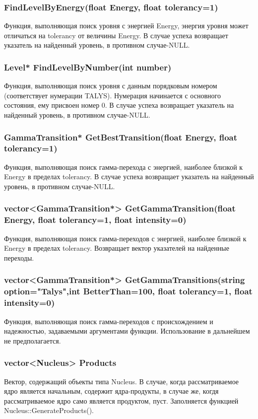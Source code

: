 \documentclass[a4paper,12pt]{extarticle}
\begin{document}
\subsubsection{FindLevelByEnergy(float Energy, float tolerancy=1)}
Функция, выполняющая поиск уровня с энергией Energy, энергия уровня может отличаться на tolerancy от величины Energy. В случае успеха возвращает указатель на найденный уровень, в противном случае-NULL.
\subsubsection{Level* FindLevelByNumber(int number)}
Функция, выполняющая поиск уровня с данным порядковым номером (соответствует нумерации TALYS). Нумерация начинается с основного состояния, ему присвоен номер 0. В случае успеха возвращает указатель на найденный уровень, в противном случае-NULL.
\subsubsection{GammaTransition* GetBestTransition(float Energy, float tolerancy=1)}
Функция, выполняющая поиск гамма-перехода с энергией, наиболее близкой к Energy в пределах tolerancy. В случае успеха возвращает указатель на найденный уровень, в противном случае-NULL.
\subsubsection{vector<GammaTransition*> GetGammaTransition(float Energy, float tolerancy=1, float intensity=0)}
Функция, выполняющая поиск гамма-переходов с энергией, наиболее близкой к Energy в пределах tolerancy. Возвращает вектор указателей на найденные переходы.
\subsubsection{vector<GammaTransition*> GetGammaTransitions(string option="Talys",int BetterThan=100, float tolerancy=1, float intensity=0)}
Функция, выполняющая поиск гамма-переходов с происхождением и надежностью, задаваемыми аргументами функции. Использование в дальнейшем не предполагается.
\subsubsection{vector<Nucleus> Products}
Вектор, содержащий объекты типа Nucleus. В случае, когда рассматриваемое ядро является начальным, содержит ядра-продукты, в случае же, когдя рассматриваемое ядро само является продуктом, пуст. Заполняется функцией Nucleus::GenerateProducts().
\end{document}
